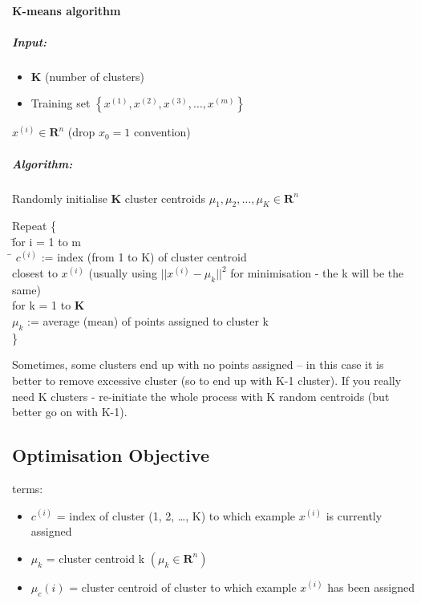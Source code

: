 \documentclass{scrartcl}
\begin{document}
\paragraph{K-means algorithm}

\subparagraph{Input:}
\begin{itemize}
\item $\mathbf{ K }$ (number of clusters)
\item Training set $\left\{ x^{(1)}, x^{(2)}, x^{(3)}, \dots , x^{(m)}
  \right\}$
\end{itemize}
$x^{(i)} \in \mathbf{R}^n$ (drop $x_0 = 1$ convention)

\subparagraph{Algorithm:} Randomly initialise $\mathbf{K}$ cluster
centroids $\mu_1, \mu_2, \dots, \mu_K \in \mathbf{R}^n$

\begin{tabbing}
  Repeat \{    \\
  \quad \quad \= for i = 1 to m \\
  \quad \quad \> \quad \=  $c^{(i)}$ := index (from 1 to K) of cluster
  centroid \\
  \quad \quad \> \quad \> closest to $x^{(i)}$ (usually using
  $||x^{(i)} - \mu_k||^2$ for minimisation - the k will be the same) \\
  \quad \quad \> for k = 1 to $\mathbf{K}$ \\
  \quad \quad \> \quad \> $\mu_k$ := average (mean) of points assigned
  to cluster k \\
  \}
\end{tabbing}
Sometimes, some clusters end up with no points assigned -- in this
case it is better to remove excessive cluster (so to end up with K-1
cluster). If you really need K clusters - re-initiate the whole
process with K random centroids (but better go on with K-1).

\subsection{Optimisation Objective}
\label{sec:13-3}
terms:
\begin{itemize}
\item $c^{(i)}$ = index of cluster (1, 2, \dots, K) to which example
  $x^{(i)}$ is currently assigned
\item $\mu_k$ = cluster centroid k $(\mu_k \in \mathbf{R}^n)$
\item $\mu_c(i)$ = cluster centroid of cluster to which example
  $x^{(i)}$ has been assigned
\end{itemize}
\end{document}
